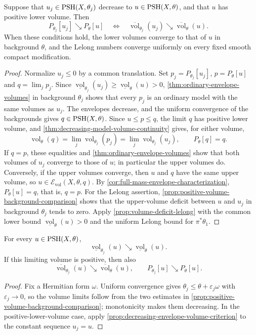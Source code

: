 \begin{proposition}\label{prop:decreasing-envelope-volume-criterion}
Suppose that $u_j\in\mathrm{PSH}(X,\theta_j)$ decrease to $u\in\mathrm{PSH}(X,\theta)$, and that $u$ has positive lower volume. Then
\[
 P_{\theta_j}[u_j]\searrow P_\theta[u]
 \quad\Longleftrightarrow\quad
 \overline{\operatorname{vol}}_{\theta_j}(u_j)\searrow
       \overline{\operatorname{vol}}_\theta(u).
\]
When these conditions hold, the lower volumes converge to that of $u$ in background $\theta$, and the Lelong numbers converge uniformly on every fixed smooth compact modification.
\end{proposition}
\begin{proof}
Normalize $u_j\leq0$ by a common translation. Set $p_j=P_{\theta_j}[u_j]$, $p=P_\theta[u]$ and $q=\lim_jp_j$. Since $\underline{\operatorname{vol}}_{\theta_j}(u_j)\geq\underline{\operatorname{vol}}_\theta(u)>0$, \cref{thm:ordinary-envelope-volumes} in background $\theta_j$ shows that every $p_j$ is an ordinary model with the same volumes as $u_j$. The envelopes decrease, and the uniform convergence of the backgrounds gives $q\in\mathrm{PSH}(X,\theta)$. Since $u\leq p\leq q$, the limit $q$ has positive lower volume, and \cref{thm:decreasing-model-volume-continuity} gives, for either volume,
\[
 \operatorname{vol}_\theta(q)
       =\lim_j\operatorname{vol}_{\theta_j}(p_j)
       =\lim_j\operatorname{vol}_{\theta_j}(u_j),
 \qquad P_\theta[q]=q.
\]
If $q=p$, these equalities and \cref{thm:ordinary-envelope-volumes} show that both volumes of $u_j$ converge to those of $u$; in particular the upper volumes do. Conversely, if the upper volumes converge, then $u$ and $q$ have the same upper volume, so $u\in\mathcal E_{\mathrm{vol}}(X,\theta,q)$. By \cref{cor:full-mass-envelope-characterization}, $P_\theta[u]=q$, that is, $q=p$. For the Lelong assertion, \cref{prop:positive-volume-background-comparison} shows that the upper-volume deficit between $u$ and $u_j$ in background $\theta_j$ tends to zero. Apply \cref{prop:volume-deficit-lelong} with the common lower bound $\underline{\operatorname{vol}}_\theta(u)>0$ and the uniform Lelong bound for $\pi^*\theta_1$.
\end{proof}

\begin{corollary}\label{cor:ordinary-envelope-background-limit}
For every $u\in\mathrm{PSH}(X,\theta)$,
\[
 \underline{\operatorname{vol}}_{\theta_j}(u)\searrow
       \underline{\operatorname{vol}}_\theta(u).
\]
If this limiting volume is positive, then also
\[
 \overline{\operatorname{vol}}_{\theta_j}(u)\searrow
       \overline{\operatorname{vol}}_\theta(u),\qquad
 P_{\theta_j}[u]\searrow P_\theta[u].
\]
\end{corollary}
\begin{proof}
Fix a Hermitian form $\omega$. Uniform convergence gives $\theta_j\leq\theta+\varepsilon_j\omega$ with $\varepsilon_j\to0$, so the volume limits follow from the two estimates in \cref{prop:positive-volume-background-comparison}; monotonicity makes them decreasing. In the positive-lower-volume case, apply \cref{prop:decreasing-envelope-volume-criterion} to the constant sequence $u_j=u$.
\end{proof}

